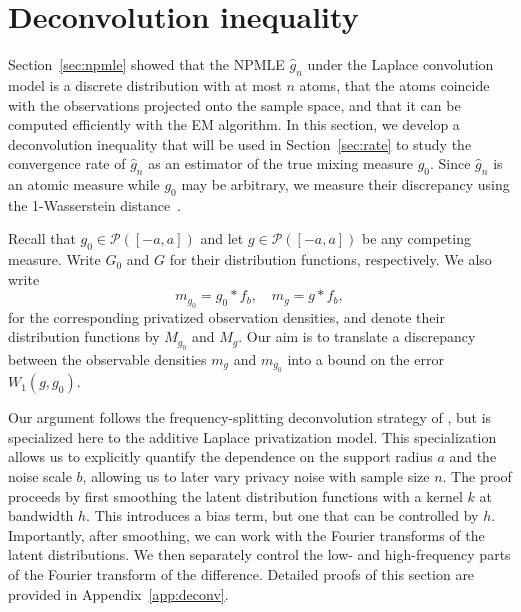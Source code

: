 \documentclass[english, 11pt]{article}
\theoremstyle{plain}
\theoremstyle{definition}
\theoremstyle{remark}
\begin{document}
\section{Deconvolution inequality}\label{sec:deconv}

Section~\ref{sec:npmle} showed that the NPMLE $\widehat g_n$ under the Laplace convolution model is a discrete distribution with at most $n$ atoms, that the atoms coincide with the observations projected onto the sample space, and that it can be computed efficiently with the EM algorithm.
In this section, we develop a deconvolution inequality that will be used in Section~\ref{sec:rate} to study the convergence rate of $\widehat g_n$ as an estimator of the true mixing measure $g_0$.
Since $\widehat g_n$ is an atomic measure while $g_0$ may be arbitrary, we measure their discrepancy using the 1-Wasserstein distance~\cite{villani2009optimal}.

Recall that $g_0\in\mathcal P([-a,a])$ and let $g\in\mathcal P([-a,a])$ be any competing measure.
Write $G_0$ and $G$ for their distribution functions, respectively.
We also write
\begin{equation*}
m_{g_0}=g_0*f_b,\quad m_g=g*f_b,
\end{equation*}
for the corresponding privatized observation densities, and denote their distribution functions by $M_{g_0}$ and $M_g$.
Our aim is to translate a discrepancy between the observable densities $m_g$ and $m_{g_0}$ into a bound on the error $W_1(g,g_0)$.

Our argument follows the frequency-splitting deconvolution strategy of \cite{rousseau2024wasserstein},
but is specialized here to the additive Laplace privatization model. 
This specialization allows us to explicitly quantify the dependence on the support radius $a$ and the noise scale $b$, allowing us to later vary privacy noise with sample size $n$. 
The proof proceeds by first smoothing the latent distribution functions with a kernel $k$ at bandwidth $h$. This introduces a bias term, but one that can be controlled by $h$. Importantly, after smoothing, we can work with the Fourier transforms of the latent distributions. 
We then separately control the low- and high-frequency parts of the Fourier transform of the difference. 
Detailed proofs of this section are provided in Appendix~\ref{app:deconv}.
\end{document}
